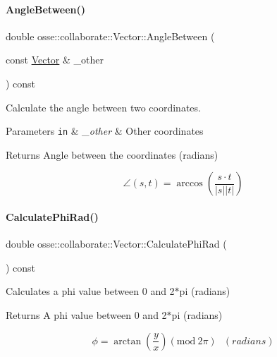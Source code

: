\paragraph{\texorpdfstring{Angle\+Between()}{AngleBetween()}}
{\footnotesize\ttfamily double osse\+::collaborate\+::\+Vector\+::\+Angle\+Between (\begin{DoxyParamCaption}\item[{const \hyperlink{classosse_1_1collaborate_1_1_vector}{Vector} \&}]{\+\_\+other }\end{DoxyParamCaption}) const}



Calculate the angle between two coordinates. 


\begin{DoxyParams}[1]{Parameters}
\mbox{\tt in}  & {\em \+\_\+other} & Other coordinates \\
\hline
\end{DoxyParams}
\begin{DoxyReturn}{Returns}
Angle between the coordinates (radians)
\end{DoxyReturn}
\[ \angle(s, t) = \arccos{\left(\frac{s \cdot t}{\lvert s\rvert\lvert t\rvert}\right)} \] \mbox{\label{classosse_1_1collaborate_1_1_vector_af4e5954804008f6fd041536ab5bb8efe}} 
\paragraph{\texorpdfstring{Calculate\+Phi\+Rad()}{CalculatePhiRad()}}
{\footnotesize\ttfamily double osse\+::collaborate\+::\+Vector\+::\+Calculate\+Phi\+Rad (\begin{DoxyParamCaption}{ }\end{DoxyParamCaption}) const}



Calculates a phi value between 0 and 2$\ast$pi (radians) 

\begin{DoxyReturn}{Returns}
A phi value between 0 and 2$\ast$pi (radians)
\end{DoxyReturn}
\[ \phi = \arctan{\left(\frac{y}{x}\right)} (\mathrm{mod}\ 2\pi) ~~~(radians) \] \mbox{\label{classosse_1_1collaborate_1_1_vector_a21c93523c1b0c578e88b4ba831b2021e}} 
